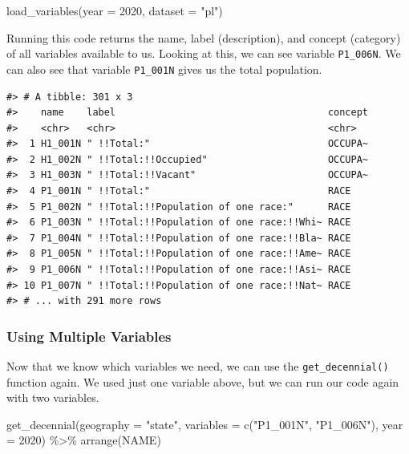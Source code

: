 \documentclass[
]{book}
\newenvironment{Shaded}{\begin{snugshade}}{\end{snugshade}}
\newcommand{\AttributeTok}[1]{\textcolor[rgb]{0.77,0.63,0.00}{#1}}
\newcommand{\DecValTok}[1]{\textcolor[rgb]{0.00,0.00,0.81}{#1}}
\newcommand{\FunctionTok}[1]{\textcolor[rgb]{0.00,0.00,0.00}{#1}}
\newcommand{\NormalTok}[1]{#1}
\newcommand{\SpecialCharTok}[1]{\textcolor[rgb]{0.00,0.00,0.00}{#1}}
\newcommand{\StringTok}[1]{\textcolor[rgb]{0.31,0.60,0.02}{#1}}
\begin{document}
\begin{Shaded}
\begin{Highlighting}[]
\FunctionTok{load\_variables}\NormalTok{(}\AttributeTok{year =} \DecValTok{2020}\NormalTok{, }
               \AttributeTok{dataset =} \StringTok{"pl"}\NormalTok{)}
\end{Highlighting}
\end{Shaded}

Running this code returns the name, label (description), and concept (category) of all variables available to us. Looking at this, we can see variable \texttt{P1\_006N}. We can also see that variable \texttt{P1\_001N} gives us the total population.

\begin{verbatim}
#> # A tibble: 301 x 3
#>    name    label                                     concept
#>    <chr>   <chr>                                     <chr>  
#>  1 H1_001N " !!Total:"                               OCCUPA~
#>  2 H1_002N " !!Total:!!Occupied"                     OCCUPA~
#>  3 H1_003N " !!Total:!!Vacant"                       OCCUPA~
#>  4 P1_001N " !!Total:"                               RACE   
#>  5 P1_002N " !!Total:!!Population of one race:"      RACE   
#>  6 P1_003N " !!Total:!!Population of one race:!!Whi~ RACE   
#>  7 P1_004N " !!Total:!!Population of one race:!!Bla~ RACE   
#>  8 P1_005N " !!Total:!!Population of one race:!!Ame~ RACE   
#>  9 P1_006N " !!Total:!!Population of one race:!!Asi~ RACE   
#> 10 P1_007N " !!Total:!!Population of one race:!!Nat~ RACE   
#> # ... with 291 more rows
\end{verbatim}

\hypertarget{using-multiple-variables}{%
\subsubsection*{Using Multiple Variables}\label{using-multiple-variables}}

Now that we know which variables we need, we can use the \texttt{get\_decennial()} function again. We used just one variable above, but we can run our code again with two variables.

\begin{Shaded}
\begin{Highlighting}[]
\FunctionTok{get\_decennial}\NormalTok{(}\AttributeTok{geography =} \StringTok{"state"}\NormalTok{, }
              \AttributeTok{variables =} \FunctionTok{c}\NormalTok{(}\StringTok{"P1\_001N"}\NormalTok{, }\StringTok{"P1\_006N"}\NormalTok{),}
              \AttributeTok{year =} \DecValTok{2020}\NormalTok{) }\SpecialCharTok{\%\textgreater{}\%} 
  \FunctionTok{arrange}\NormalTok{(NAME)}
\end{Highlighting}
\end{Shaded}
\end{document}
